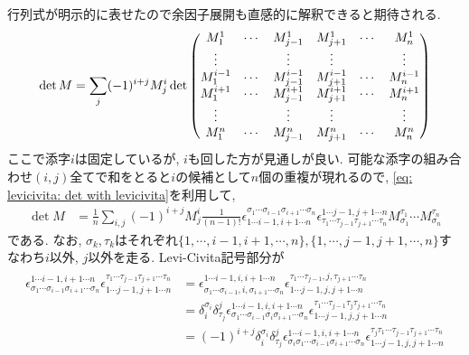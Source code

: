 \documentclass[dvipdfmx]{jsarticle}
\begin{document}
行列式が明示的に表せたので余因子展開も直感的に解釈できると期待される.
\begin{align}
    \label{eq: levicivita: cofactor expans in usual way}
    \det M
    =
    \sum_j (-1)^{i+j}M^i_j\det\mqty(
        M_1^1 & \cdots & M^1_{j-1} & M^1_{j+1} & \cdots & M^1_n
        \\
        \vdots & & \vdots & \vdots & & \vdots
        \\
        M^{i-1}_1 & \cdots & M^{i-1}_{j-1} & M^{i-1}_{j+1} & \cdots & M^{i-1}_n
        \\
        M^{i+1}_1 & \cdots & M^{i+1}_{j-1} & M^{i+1}_{j+1} & \cdots & M^{i+1}_n
        \\
        \vdots & & \vdots & \vdots & & \vdots
        \\
        M^n_1 & \cdots & M^n_{j-1} & M^n_{j+1} & \cdots & M_n^n
    )
\end{align}
ここで添字$i$は固定しているが, $i$も回した方が見通しが良い.
可能な添字の組み合わせ$(i,j)$全てで和をとると$i$の候補として$n$個の重複が現れるので, \eqref{eq: levicivita: det with levicivita}を利用して,
\begin{align*}
    \det M
    &=
    \frac{1}{n}
    \sum_{i,j} (-1)^{i+j}M^i_j
    \frac{1}{(n-1)!}
    \epsilon^{\sigma_1\cdots\sigma_{i-1}\sigma_{i+1}\cdots\sigma_n}_{1\cdots i-1,i+1\cdots n}
    \epsilon^{1\cdots j-1,j+1\cdots n}_{\tau_1\cdots\tau_{j-1}\tau_{j+1}\cdots\tau_n}
    M_{\sigma_1}^{\tau_1}\cdots M^{\tau_n}_{\sigma_n}
\end{align*}
である.
なお, $\sigma_k, \tau_k$はそれぞれ$\{1, \cdots, i-1, i+1, \cdots, n\}, \{1, \cdots, j-1, j+1, \cdots, n\}$すなわち$i$以外, $j$以外を走る.
Levi-Civita記号部分が
\begin{align}
    \label{eq: levicivita: levicivita technique for cofactor expansion}
    \begin{split}
        \epsilon^{1\cdots i-1,i+1\cdots n}_{\sigma_1\cdots\sigma_{i-1}\sigma_{i+1}\cdots\sigma_n}
        \epsilon_{1\cdots j-1,j+1\cdots n}^{\tau_1\cdots\tau_{j-1}\tau_{j+1}\cdots\tau_n}
        &=
        \epsilon^{1\cdots i-1,i,i+1\cdots n}_{\sigma_1\cdots\sigma_{i-1},i,\sigma_{i+1}\cdots\sigma_n}
        \epsilon_{1\cdots j-1,j,j+1\cdots n}^{\tau_1\cdots\tau_{j-1},j,\tau_{j+1}\cdots\tau_n}
        \\
        &=
        \delta_i^{\sigma_i}\delta_{\tau_j}^j
        \epsilon^{1\cdots i-1,i,i+1\cdots n}_{\sigma_1\cdots\sigma_{i-1}\sigma_i\sigma_{i+1}\cdots\sigma_n}
        \epsilon_{1\cdots j-1,j,j+1\cdots n}^{\tau_1\cdots\tau_{j-1}\tau_j\tau_{j+1}\cdots\tau_n}
        \\
        &=
        (-1)^{i+j}
        \delta_i^{\sigma_i}\delta_{\tau_j}^j
        \epsilon^{1\cdots i-1,i,i+1\cdots n}_{\sigma_i\sigma_1\cdots\sigma_{i-1}\sigma_{i+1}\cdots\sigma_n}
        \epsilon_{1\cdots j-1,j,j+1\cdots n}^{\tau_j\tau_1\cdots\tau_{j-1}\tau_{j+1}\cdots\tau_n}
    \end{split}
\end{align}
\end{document}
